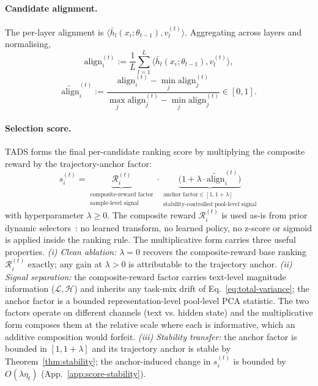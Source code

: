 \paragraph{Candidate alignment.}
The per-layer alignment is
$\langle \bar h_l(x_i;\theta_{t-1}), v_l^{(t)} \rangle$. Aggregating
across layers and normalising,
\begin{equation}
  \mathrm{align}_i^{(t)} :=
  \frac{1}{L}\sum_{l=1}^{L}
  \bigl\langle \bar h_l(x_i;\theta_{t-1}), v_l^{(t)} \bigr\rangle,
  \label{eq:align-raw}
\end{equation}
\begin{equation}
  \widetilde{\mathrm{align}}_i^{(t)} :=
  \frac{\mathrm{align}_i^{(t)} - \min_j \mathrm{align}_j^{(t)}}
       {\max_j \mathrm{align}_j^{(t)} - \min_j \mathrm{align}_j^{(t)}}
  \in [0,1].
  \label{eq:align}
\end{equation}

\paragraph{Selection score.}
\textsc{TADS} forms the final per-candidate ranking score by
multiplying the composite reward by the trajectory-anchor factor:
\begin{equation}
\boxed{
s_i^{(t)}
=
\underbrace{\mathcal{R}_i^{(t)}}_{\substack{\text{composite-reward factor}\\[1pt]
\text{sample-level signal}}}
\cdot
\underbrace{\bigl(1+\lambda \cdot \widetilde{\mathrm{align}}_i^{(t)}\bigr)}_{\substack{\text{anchor factor} \in [1, 1+\lambda]\\[1pt]
\text{stability-controlled pool-level signal}}}
}
\label{eq:score}
\end{equation}
with hyperparameter $\lambda \ge 0$. The composite reward
$\mathcal{R}_i^{(t)}$ is used as-is from prior dynamic
selectors~\cite{kung2023activeit, sun2025dots}: no learned
transform, no learned policy, no z-score or sigmoid is applied
inside the ranking rule. The multiplicative form carries three
useful properties. \emph{(i) Clean ablation:} $\lambda{=}0$
recovers the composite-reward base ranking $\mathcal{R}_i^{(t)}$
exactly; any gain at $\lambda>0$ is attributable to the
trajectory anchor. \emph{(ii) Signal separation:} the
composite-reward factor carries text-level magnitude information
($\mathcal{L}, \mathcal{H}$) and inherits any task-mix drift of
Eq.~\ref{eq:total-variance}; the anchor factor is a bounded
representation-level pool-level PCA statistic. The two factors
operate on different channels (text vs. hidden state) and the
multiplicative form composes them at the relative scale where
each is informative, which an additive composition would forfeit.
\emph{(iii) Stability transfer:} the anchor factor is bounded in
$[1, 1+\lambda]$ and its trajectory anchor is stable by
Theorem~\ref{thm:stability}; the anchor-induced change in
$s_i^{(t)}$ is bounded by $O(\lambda\eta_t)$
(App.~\ref{app:score-stability}).


